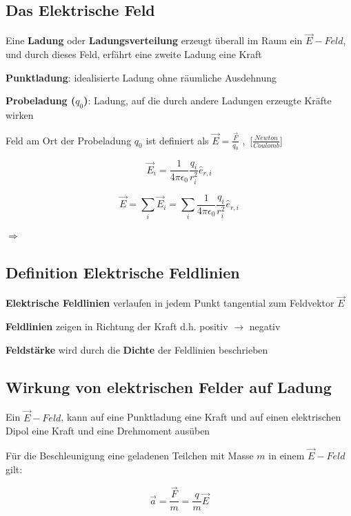 \begin{flushleft}
\subsection{Das Elektrische Feld}
Eine \textbf{Ladung} oder \textbf{Ladungsverteilung} erzeugt überall im Raum ein \textbf{$\Vec{E}-Feld$}, und durch dieses Feld, erfährt eine zweite Ladung eine Kraft

\textbf{Punktladung}: idealisierte Ladung ohne räumliche Ausdehnung

\textbf{Probeladung ($q_0$)}: Ladung, auf die durch andere Ladungen erzeugte Kräfte wirken


Feld am Ort der Probeladung $q_0$ ist definiert als $\Vec{E} = \frac{\Vec{F}}{q_0}$ ,\ [$\frac{Newton}{Coulomb}$]
\begin{formulabox}
    \[
    \Vec{E}_i = \frac{1}{4\pi\epsilon_0}\frac{q_i}{r_i^2}\hat{e}_{r,i}
    \]
\end{formulabox}
\begin{formulabox}
\[
    \Vec{E} = \sum_i\Vec{E}_i = \sum_i\frac{1}{4\pi\epsilon_0}\frac{q_i}{r_i^2}\hat{e}_{r,i}
\]    
\end{formulabox}

$\Rightarrow$ 

\subsection{Definition Elektrische Feldlinien}
\textbf{Elektrische Feldlinien} verlaufen in jedem Punkt tangential zum Feldvektor $\Vec{E}$

\textbf{Feldlinien} zeigen in Richtung der Kraft d.h. positiv $\rightarrow$ negativ

\textbf{Feldstärke} wird durch die \textbf{Dichte} der Feldlinien beschrieben

\subsection{Wirkung von elektrischen Felder auf Ladung}
Ein $\Vec{E}-Feld$, kann auf eine Punktladung eine Kraft und auf einen elektrischen Dipol eine Kraft und eine Drehmoment ausüben

Für die Beschleunigung eine geladenen Teilchen mit Masse $m$ in einem $\Vec{E}-Feld$ gilt:
\begin{formulabox}
\[
    \Vec{a} = \frac{\Vec{F}}{m} = \frac{q}{m}\Vec{E}
\]  
\end{formulabox}


\end{flushleft}
